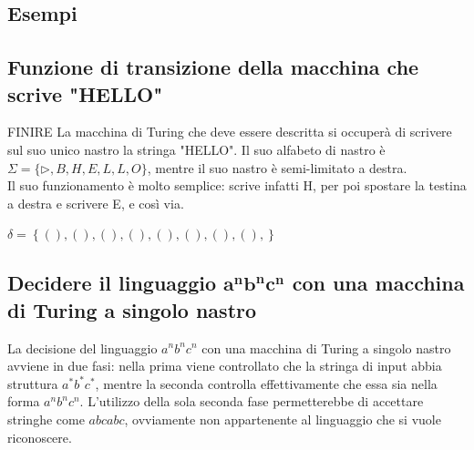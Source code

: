 \subsection{Esempi}

\subsection*{Funzione di transizione della macchina che scrive "HELLO"}
FINIRE
La macchina di Turing che deve essere descritta si occuperà di scrivere sul
suo unico nastro la stringa "HELLO".
Il suo alfabeto di nastro è $\Sigma = \{ \triangleright , B, H, E, L, L, O \}$,
mentre il suo nastro è semi-limitato a destra.\\
Il suo funzionamento è molto semplice: scrive infatti H, per poi spostare la
testina a destra e scrivere E, e così via.

$\delta = \left\{
(),
(),
(),
(),
(),
(),
(),
(),
\right\}$

\subsection*{Decidere il linguaggio $\mathbf{a^nb^nc^n}$ con una macchina di
Turing a singolo nastro}
La decisione del linguaggio $a^nb^nc^n$ con una macchina di Turing a singolo
nastro avviene in due fasi: nella prima viene controllato che la stringa di
input abbia struttura $a^*b^*c^*$, mentre la seconda controlla effettivamente
che essa sia nella forma $a^nb^nc^n$.
L'utilizzo della sola seconda fase permetterebbe di accettare stringhe come
$abcabc$, ovviamente non appartenente al linguaggio che si vuole riconoscere.

